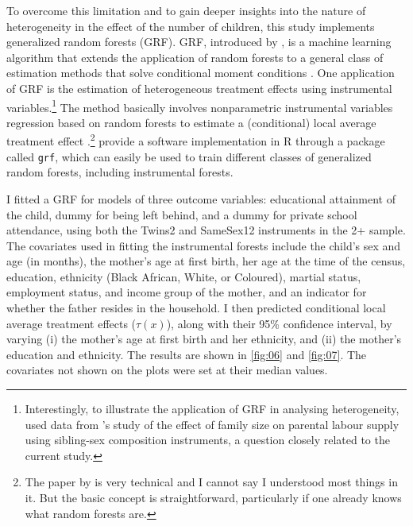 To overcome this limitation and to gain deeper insights into the nature of heterogeneity in the effect of the number of children, this study implements generalized random forests (GRF). GRF, introduced by \textcite{Athey2019}, is a machine learning algorithm that extends the application of random forests to a general class of estimation methods that solve conditional moment conditions \parencite{Biewen2020}. One application of GRF is the estimation of heterogeneous treatment effects using instrumental variables.\footnote{ Interestingly, to illustrate the application of GRF in analysing heterogeneity, \textcite{Athey2019} used data from \textcite{angrist_children_1998}'s study of the effect of family size on parental labour supply using sibling-sex composition instruments, a question closely related to the current study. } The method basically involves nonparametric instrumental variables regression based on random forests to estimate a (conditional) local average treatment effect \parencite{Athey2019}.\footnote{ The paper by \textcite{Athey2019} is very technical and I cannot say I understood most things in it. But the basic concept is straightforward, particularly if one already knows what random forests are. } \textcite{Athey2019} provide a software implementation in R through a package called \texttt{grf}, which can easily be used to train different classes of generalized random forests, including instrumental forests.    

I fitted a GRF for models of three outcome variables: educational attainment of the child, dummy for being left behind, and a dummy for private school attendance, using both the Twins2 and SameSex12 instruments in the 2+ sample. The covariates used in fitting the instrumental forests include the child's sex and age (in months), the mother's age at first birth, her age at the time of the census, education, ethnicity (Black African, White, or Coloured), martial status, employment status, and income group of the mother, and an indicator for whether the father resides in the household. I then predicted conditional local average treatment effects ($ \tau(x) $), along with their 95\% confidence interval, by varying (i) the mother’s age at first birth and her ethnicity, and (ii) the mother's education and ethnicity. The results are shown in \autoref{fig:06} and \autoref{fig:07}. The covariates not shown on the plots were set at their median values. 

